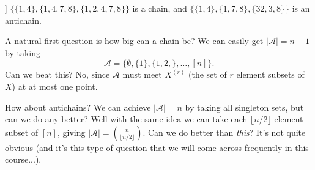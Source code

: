 \documentclass[a4paper]{scrartcl}
\begin{document}
\begin{example}]
    $\{\{1, 4\}, \{1, 4, 7, 8\}, \{1, 2, 4, 7, 8\}\}$ is a chain, and  $\{\{1, 4\}, \{1, 7, 8\}, \{32, 3, 8\}\}$ is an antichain.
\end{example}

A natural first question is how big can a chain be? We can easily get $|\mathcal{A}| = n - 1$ by taking
$$
\mathcal{A} = \{\emptyset, \{1\}, \{1, 2, \}, \dots, [n]\}.
$$
Can we beat this? No, since $\mathcal{A}$ must meet $X^{(r)}$ (the set of $r$ element subsets of $X$) at at most one point.

How about antichains? We can achieve $|\mathcal{A}| = n$ by taking all singleton sets, but can we do any better? Well with the same idea we can take each $\lfloor n/2\rfloor$-element subset of $[n]$, giving $|\mathcal{A}| = \binom{n}{\lfloor n/2\rfloor}$. Can we do better than \emph{this}? It's not quite obvious (and it's this type of question that we will come across frequently in this course...).
\end{document}
